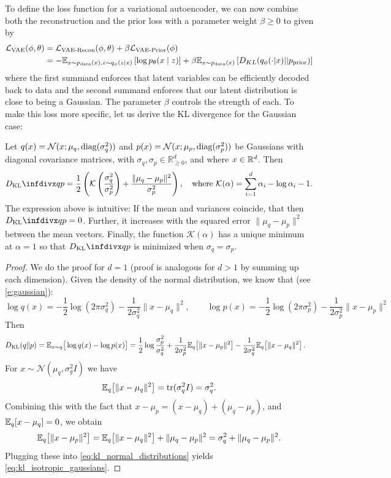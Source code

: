 To define the loss function for a variational autoencoder, we can now combine both the reconstruction and the prior loss with a parameter weight $\beta\geq 0$ to  given by
\begin{align}
\mathcal{L}_{\text{VAE}}(\phi,\theta)&=\mathcal{L}_{\text{VAE-Recon}}(\phi,\theta)+\beta\mathcal{L}_{\text{VAE-Prior}}(\phi)\\
&=-\mathbb{E}_{x \sim p_{\rm{data}}(x),z\sim q_\phi(z|x)} \left[\log p_\theta(x\mid z)\right]+\beta\mathbb{E}_{x \sim p_{\rm{data}}(x)} \left[D_{KL}(q_\phi(\cdot|x)||p_{\text{prior}})\right]
\end{align}
where the first summand enforces that latent variables can be efficiently decoded back to data and the second summand enforces that our latent distribution is close to being a Gaussian. The parameter $\beta$ controls the strength of each. To make this loss more specific, let us derive the KL divergence for the Gaussian case:
\begin{examplebox}
\label{example:kl_divergence_between_isotropic_normals}
Let $q(x)=\mathcal N(x;\mu_q,\textrm{diag}(\sigma_q^2))$ and $p(x)=\mathcal N(x;\mu_p,\textrm{diag}(\sigma_p^2))$ be Gaussians with diagonal covariance matrices, with $\sigma_q,\sigma_{p}\in\mathbb{R}_{\geq 0}^d$, and where $x \in \mathbb{R}^d$. Then
\begin{align}
\dkl{q}{p}
=\frac12\left(
\mathcal{K}\left(\frac{\sigma_{q}^2}{\sigma_{p}^2}\right)+ \frac{\|\mu_q-\mu_p\|^2}{\sigma_p^2}
\right),\quad \text{where }\mathcal{K}(\alpha)=\sum\limits_{i=1}^{d}\alpha_i-\log \alpha_i-1.
\label{eq:kl_isotropic_gaussians}
\end{align}
The expression above is intuitive: If the mean and variances coincide, that then $\dkl{q}{p}=0$. Further, it increases with the squared error $\|\mu_{q}-\mu_{p}\|^2$ between the mean vectors. Finally, the function $\mathcal{K}(\alpha)$ has a unique minimum at $\alpha=1$ so that $\dkl{q}{p}$ is minimized when $\sigma_{q}=\sigma_{p}$.
\begin{proof}
We do the proof for $d=1$ (proof is analogous for $d>1$ by summing up each dimension). Given the density of the normal distribution, we know that (see \cref{e:gaussian}):
\[
\log q(x)= -\frac {1}{2}\log(2\pi\sigma_q^2)-\frac{1}{2\sigma_q^2}\|x-\mu_q\|^2,
\qquad
\log p(x)= -\frac 12\log(2\pi\sigma_p^2)-\frac{1}{2\sigma_p^2}\|x-\mu_p\|^2
\]
Then
\begin{align}
\label{eq:kl_normal_distributions}
D_{\mathrm{KL}}(q\|p)
&=\mathbb{E}_{x\sim q}\big[\log q(x)-\log p(x)\big]=\frac 12\log\frac{\sigma_p^2}{\sigma_q^2}
+\frac{1}{2\sigma_p^2}\mathbb{E}_q\!\left[\|x-\mu_p\|^2\right]
-\frac{1}{2\sigma_q^2}\mathbb{E}_q\!\left[\|x-\mu_q\|^2\right].
\end{align}
For $x\sim \mathcal N(\mu_q,\sigma_q^2 I)$ we have
\[
\mathbb{E}_q\!\left[\|x-\mu_q\|^2\right]=\mathrm{tr}(\sigma_q^2 I)=\sigma_q^2.
\]
Combining this with the fact that $x-\mu_p=(x-\mu_q)+(\mu_q-\mu_p)$, and $\mathbb{E}_q[x-\mu_q]=0$, we obtain
\[
\mathbb{E}_q\!\left[\|x-\mu_p\|^2\right]
=\mathbb{E}_q\!\left[\|x-\mu_q\|^2\right]+\|\mu_q-\mu_p\|^2
=\sigma_q^2+\|\mu_q-\mu_p\|^2.
\]
Plugging these into \cref{eq:kl_normal_distributions} yields \eqref{eq:kl_isotropic_gaussians}.
\end{proof}
\end{examplebox}

